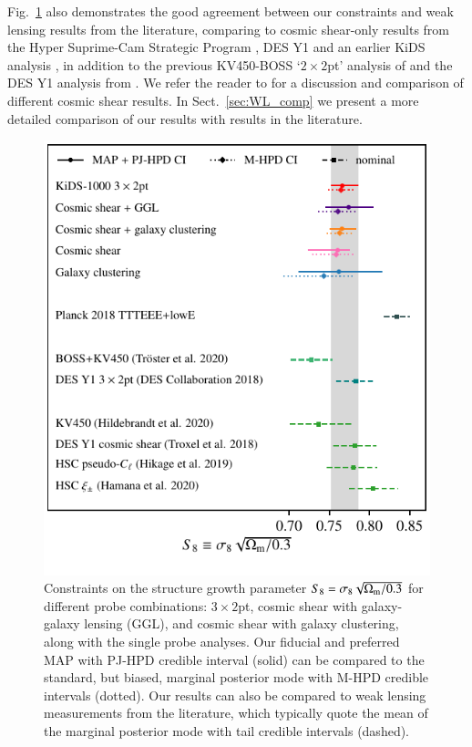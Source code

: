 Fig.~\ref{fig:S8comp} also demonstrates the good agreement between our constraints and weak lensing results from the literature, comparing to cosmic shear-only results from the Hyper Suprime-Cam Strategic Program \citep[HSC,][]{hikage/etal:2019,hamana/etal:2020}, DES Y1 \citep{troxel/etal:2018} and an earlier KiDS analysis \citep[KV450][]{hildebrandt/etal:2020}, in addition to the previous KV450-BOSS `$2\times2$pt' analysis of \citet{troester/etal:2020} and the DES Y1 \tttp analysis from \citet{abbott/etal:2018}.   We refer the reader to \citet{asgari/etal:inprep} for a discussion and comparison of different cosmic shear results.  In Sect.~\ref{sec:WL_comp} we present a more detailed comparison of our results with \tttp results in the literature.

\begin{figure}
	\begin{center}
		\includegraphics[width=\columnwidth]{Parameter_Plots/cosmology/S8_comparison_blindC}
		\caption{Constraints on the structure growth parameter $S_{8} = \sigma_8 \sqrt{\Omega_{\rm m}/0.3}$ for different probe combinations: $3\times2$pt, cosmic shear with galaxy-galaxy lensing (GGL), and cosmic shear with galaxy clustering, along with the single probe analyses.   Our fiducial and preferred MAP with PJ-HPD credible interval (solid) can be compared to the standard, but biased, marginal posterior mode with M-HPD credible intervals (dotted).    Our results can also be compared to weak lensing measurements from the literature, which typically quote the mean of the marginal posterior mode with tail credible intervals (dashed). 
		\label{fig:S8comp}}
	\end{center}
\end{figure}


